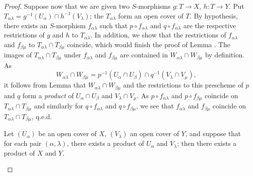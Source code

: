 \begin{proof}
Suppose now that we are given two $S$-morphisms $g:T\to X$, $h:T\to Y$. Put
$T_{\alpha\lambda}=g^{-1}(U_\alpha)\cap h^{-1}(V_\lambda)$; the $T_{\alpha\lambda}$ form an
open cover of $T$. By hypothesis, there exists an $S$-morphism $f_{\alpha\lambda}$ such that
$p\circ f_{\alpha\lambda}$ and $q\circ f_{\alpha\lambda}$ are the respective restrictions of
$g$ and $h$ to $T_{\alpha\lambda}$. In addition, we show that the restrictions of
$f_{\alpha\lambda}$ and $f_{\beta\mu}$ to $T_{\alpha\lambda}\cap T_{\beta\mu}$ coincide,
which would finish the proof of Lemma . The images of
$T_{\alpha\lambda}\cap T_{\beta\mu}$ under $f_{\alpha\lambda}$ and $f_{\beta\mu}$ are
contained in $W_{\alpha\lambda}\cap W_{\beta\mu}$ by definition. As
\[
  W_{\alpha\lambda}\cap W_{\beta\mu}
  =p^{-1}(U_\alpha\cap U_\beta)\cap q^{-1}(V_\lambda\cap V_\mu),
\]
it follows from Lemma  that $W_{\alpha\lambda}\cap W_{\beta\mu}$ and the
restrictions to this prescheme of $p$ and $q$ form a \emph{product} of $U_\alpha\cap U_\beta$
and $V_\lambda\cap V_\mu$. As $p\circ f_{\alpha\lambda}$ and $p\circ f_{\beta\mu}$ coincide
on $T_{\alpha\lambda}\cap T_{\beta\mu}$ and similarly for $q\circ f_{\alpha\lambda}$ and
$q\circ f_{\beta\mu}$, we see that $f_{\alpha\lambda}$ and $f_{\beta\mu}$ coincide on
$T_{\alpha\lambda}\cap T_{\beta\mu}$, q.e.d.

\begin{lem}[3.2.6.3]
\label{1.3.2.6.3}
Let $(U_\alpha)$ be an open cover of $X$, $(V_\lambda)$ an open cover of $Y$, and suppose
that for each pair $(\alpha,\lambda)$, there exists a product of $U_\alpha$ and $V_\lambda$;
then there exists a product of $X$ and $Y$.
\end{lem}


\end{proof}
